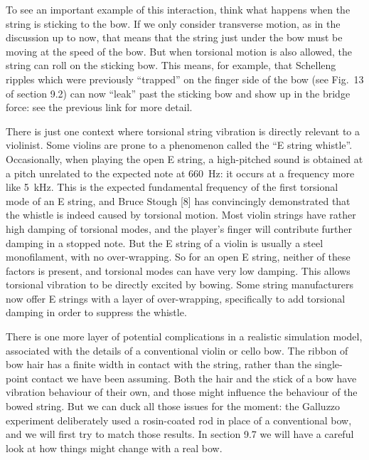 
  To see an important example of this interaction, think what happens when the 
  string is sticking to the bow. If we only consider transverse motion, as in 
  the discussion up to now, that means that the string just under the bow must 
  be moving at the speed of the bow. But when torsional motion is also allowed, 
  the string can roll on the sticking bow. This means, for example, that 
  Schelleng ripples which were previously “trapped” on the finger side of the 
  bow (see Fig.\ 13 of section 9.2) can now “leak” past the sticking bow and 
  show up in the bridge force: see the previous link for more detail. 

  There is just one context where torsional string vibration is directly 
  relevant to a violinist. Some violins are prone to a phenomenon called the 
  ``E string whistle''. Occasionally, when playing the open E string, a 
  high-pitched sound is obtained at a pitch unrelated to the expected note at 
  660~Hz: it occurs at a frequency more like 5~kHz. This is the expected 
  fundamental frequency of the first torsional mode of an E string, and Bruce 
  Stough [8] has convincingly demonstrated that the whistle is indeed caused by 
  torsional motion. Most violin strings have rather high damping of torsional 
  modes, and the player's finger will contribute further damping in a stopped 
  note. But the E string of a violin is usually a steel monofilament, with no 
  over-wrapping. So for an open E string, neither of these factors is present, 
  and torsional modes can have very low damping. This allows torsional 
  vibration to be directly excited by bowing. Some string manufacturers now 
  offer E strings with a layer of over-wrapping, specifically to add torsional 
  damping in order to suppress the whistle. 

  There is one more layer of potential complications in a realistic simulation 
  model, associated with the details of a conventional violin or cello bow. The 
  ribbon of bow hair has a finite width in contact with the string, rather than 
  the single-point contact we have been assuming. Both the hair and the stick 
  of a bow have vibration behaviour of their own, and those might influence the 
  behaviour of the bowed string. But we can duck all those issues for the 
  moment: the Galluzzo experiment deliberately used a rosin-coated rod in place 
  of a conventional bow, and we will first try to match those results. In 
  section 9.7 we will have a careful look at how things might change with a 
  real bow. 

